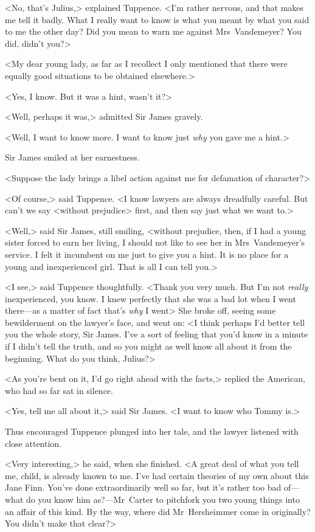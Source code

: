 <No, that's Julius,> explained Tuppence. <I'm rather nervous, and that makes me tell it badly. What I really want to know is what you meant by what you said to me the other day? Did you mean to warn me against Mrs~Vandemeyer? You did, didn't you?>

<My dear young lady, as far as I recollect I only mentioned that there were equally good situations to be obtained elsewhere.>

<Yes, I know. But it was a hint, wasn't it?>

<Well, perhaps it was,> admitted Sir James gravely.

<Well, I want to know more. I want to know just \emph{why} you gave me a hint.>

Sir James smiled at her earnestness.

<Suppose the lady brings a libel action against me for defamation of character?>

<Of course,> said Tuppence. <I know lawyers are always dreadfully careful. But can't we say <without prejudice> first, and then say just what we want to.>

<Well,> said Sir James, still smiling, <without prejudice, then, if I had a young sister forced to earn her living, I should not like to see her in Mrs~Vandemeyer's service. I felt it incumbent on me just to give you a hint. It is no place for a young and inexperienced girl. That is all I can tell you.>

<I see,> said Tuppence thoughtfully. <Thank you very much. But I'm not \emph{really} inexperienced, you know. I knew perfectly that she was a bad lot when I went there—as a matter of fact that's \emph{why} I went\longdash> She broke off, seeing some bewilderment on the lawyer's face, and went on: <I think perhaps I'd better tell you the whole story, Sir James. I've a sort of feeling that you'd know in a minute if I didn't tell the truth, and so you might as well know all about it from the beginning. What do you think, Julius?>

<As you're bent on it, I'd go right ahead with the facts,> replied the American, who had so far sat in silence.

<Yes, tell me all about it,> said Sir James. <I want to know who Tommy is.>

Thus encouraged Tuppence plunged into her tale, and the lawyer listened with close attention.

<Very interesting,> he said, when she finished. <A great deal of what you tell me, child, is already known to me. I've had certain theories of my own about this Jane Finn. You've done extraordinarily well so far, but it's rather too bad of—what do you know him as?—Mr~Carter to pitchfork you two young things into an affair of this kind. By the way, where did Mr~Hersheimmer come in originally? You didn't make that clear?>

